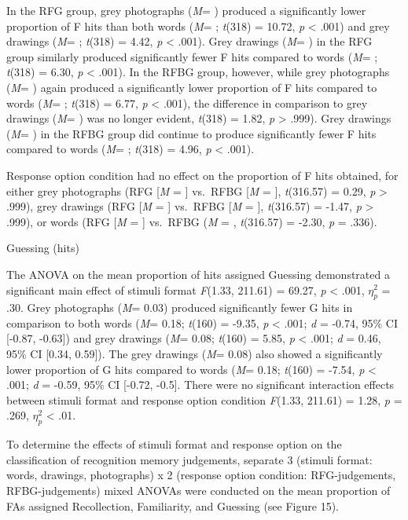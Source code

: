 \documentclass[
  11pt,
]{article}
\begin{document}
In the RFG group, grey photographs (\emph{M}= ) produced a significantly
lower proportion of F hits than both words (\emph{M}= ; \emph{t}(318) =
10.72, \emph{p} \textless{} .001) and grey drawings (\emph{M}= ;
\emph{t}(318) = 4.42, \emph{p} \textless{} .001). Grey drawings
(\emph{M}= ) in the RFG group similarly produced significantly fewer F
hits compared to words (\emph{M}= ; \emph{t}(318) = 6.30, \emph{p}
\textless{} .001). In the RFBG group, however, while grey photographs
(\emph{M}= ) again produced a significantly lower proportion of F hits
compared to words (\emph{M}= ; \emph{t}(318) = 6.77, \emph{p}
\textless{} .001), the difference in comparison to grey drawings
(\emph{M}= ) was no longer evident, \emph{t}(318) = 1.82, \emph{p}
\textgreater{} .999). Grey drawings (\emph{M}= ) in the RFBG group did
continue to produce significantly fewer F hits compared to words
(\emph{M}= ; \emph{t}(318) = 4.96, \emph{p} \textless{} .001).

Response option condition had no effect on the proportion of F hits
obtained, for either grey photographs (RFG {[}\emph{M} = {]} vs.~RFBG
{[}\emph{M} = {]}, \emph{t}(316.57) = 0.29, \emph{p} \textgreater{}
.999), grey drawings (RFG {[}\emph{M} = {]} vs.~RFBG {[}\emph{M} = {]},
\emph{t}(316.57) = -1.47, \emph{p} \textgreater{} .999), or words (RFG
{[}\emph{M} = {]} vs.~RFBG (\emph{M} = , \emph{t}(316.57) = -2.30,
\emph{p} = .336).

Guessing (hits)

The ANOVA on the mean proportion of hits assigned Guessing demonstrated
a significant main effect of stimuli format \emph{F}(1.33, 211.61) =
69.27, \emph{p} \textless{} .001, \(\eta^2_p\) = .30. Grey photographs
(\emph{M}= 0.03) produced significantly fewer G hits in comparison to
both words (\emph{M}= 0.18; \emph{t}(160) = -9.35, \emph{p} \textless{}
.001; \emph{d} = -0.74, 95\% CI {[}-0.87, -0.63{]}) and grey drawings
(\emph{M}= 0.08; \emph{t}(160) = 5.85, \emph{p} \textless{} .001;
\emph{d} = 0.46, 95\% CI {[}0.34, 0.59{]}). The grey drawings (\emph{M}=
0.08) also showed a significantly lower proportion of G hits compared to
words (\emph{M}= 0.18; \emph{t}(160) = -7.54, \emph{p} \textless{} .001;
\emph{d} = -0.59, 95\% CI {[}-0.72, -0.5{]}. There were no significant
interaction effects between stimuli format and response option condition
\emph{F}(1.33, 211.61) = 1.28, \emph{p} = .269, \(\eta^2_p\) \textless{}
.01.

To determine the effects of stimuli format and response option on the
classification of recognition memory judgements, separate 3 (stimuli
format: words, drawings, photographs) x 2 (response option condition:
RFG-judgements, RFBG-judgements) mixed ANOVAs were conducted on the mean
proportion of FAs assigned Recollection, Familiarity, and Guessing (see
Figure 15).
\end{document}
